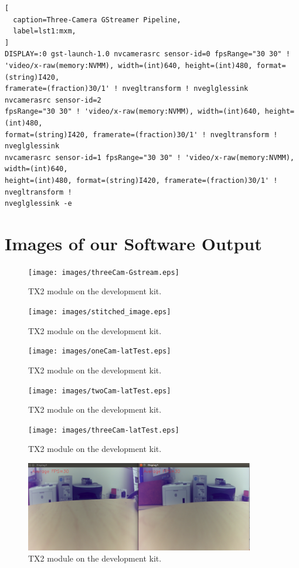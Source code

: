 \documentclass[letterpaper,10pt,serif,draftclsnofoot,onecolumn,compsoc,titlepage]{IEEEtran}
\begin{document}
\begin{lstlisting}[
  caption=Three-Camera GStreamer Pipeline,
  label=lst1:mxm,
]
DISPLAY=:0 gst-launch-1.0 nvcamerasrc sensor-id=0 fpsRange="30 30" ! 
'video/x-raw(memory:NVMM), width=(int)640, height=(int)480, format=(string)I420, 
framerate=(fraction)30/1' ! nvegltransform ! nveglglessink  nvcamerasrc sensor-id=2 
fpsRange="30 30" ! 'video/x-raw(memory:NVMM), width=(int)640, height=(int)480, 
format=(string)I420, framerate=(fraction)30/1' ! nvegltransform ! nveglglessink 
nvcamerasrc sensor-id=1 fpsRange="30 30" ! 'video/x-raw(memory:NVMM), width=(int)640, 
height=(int)480, format=(string)I420, framerate=(fraction)30/1' ! nvegltransform ! 
nveglglessink -e
\end{lstlisting}

\section{Images of our Software Output}

\begin{figure}[H]
	\centering
	\label{fig:Video output of three cameras using GStreamer.}
	\texttt{[image: images/threeCam-Gstream.eps]}
	\caption{TX2 module on the development kit. \label{overflow}}
\end{figure}

\begin{figure}[H]
	\centering
	\label{fig:Video output of our stitching program using OpenCV.}
	\texttt{[image: images/stitched\_image.eps]}
	\caption{TX2 module on the development kit. \label{overflow}}
\end{figure}

\begin{figure}[H]
	\centering
	\label{fig:The result of our one-camera latency test.}
	\texttt{[image: images/oneCam-latTest.eps]}
	\caption{TX2 module on the development kit. \label{overflow}}
\end{figure}

\begin{figure}[H]
	\centering
	\label{fig:The result of our two-camera latency test.}
	\texttt{[image: images/twoCam-latTest.eps]}
	\caption{TX2 module on the development kit. \label{overflow}}
\end{figure}

\begin{figure}[H]
	\centering
	\label{fig:The result of our three-camera latency test.}
	\texttt{[image: images/threeCam-latTest.eps]}
	\caption{TX2 module on the development kit. \label{overflow}}
\end{figure}

\begin{figure}[H]
	\centering
	\label{fig:The result of our frame per second test.}
	\includegraphics[width=10cm]{images/fps2.eps}
	\caption{TX2 module on the development kit. \label{overflow}}
\end{figure}

%
%
\end{document}
